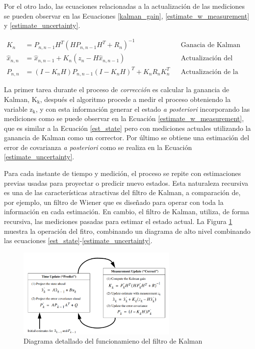 \documentclass[10pt,a4paper]{article}
\begin{document}
\noindent Por el otro lado, las ecuaciones relacionadas a la actualizaci\'on de 
las mediciones se pueden observar en las Ecuaciones \ref{kalman_gain},
\ref{estimate_w_measurement} y \ref{estimate_uncertainty}.

\begin{align}
    K_n &= P_{n, n-1}H^T(HP_{n,n-1}H^T + R_n)^{-1} & & \textrm{Ganacia de Kalman}
    \label{kalman_gain}\\
    \hat{x}_{n, n} &= \hat{x}_{n,n-1} + K_n \left(z_n - H\hat{x}_{n, n-1}\right)
    & & \textrm{Actualizaci\'on del estado}\label{estimate_w_measurement}\\
    P_{n, n} &= \left(I - K_nH\right)P_{n,n-1}\left(I - K_nH\right)^T + K_n R_n
    K_n^T & & \textrm{Actualizaci\'on de la covarianza}
    \label{estimate_uncertainty}
\end{align}

\noindent La primer tarea durante el proceso de \emph{correcci\'on} es calcular 
la ganancia de Kalman, $\mathrm{K_k}$, despu\'es el algoritmo procede a medir el
proceso obteniendo la variable $\mathrm{z_k}$, y con esta informaci\'on generar
el estado \emph{a posteriori} incorporando las mediciones como se puede observar
en la Ecuaci\'on \ref{estimate_w_measurement}, que es similar a la Ecuaci\'on
\ref{est_state} pero con mediciones actuales utilizando la ganancia de Kalman
como un corrector. Por \'ultimo se obtiene una estimaci\'on del error de
covarianza \emph{a posteriori} como se realiza en la Ecuaci\'on
\ref{estimate_uncertainty}. 

\noindent Para cada instante de tiempo y medici\'on, el proceso se repite con 
estimaciones previas usadas para proyectar o predicir nuevo estados. Esta 
naturaleza recursiva es una de las caracter\'isticas atractivas del filtro de 
Kalman, a comparaci\'on de, por ejemplo, un filtro de Wiener \cite{brown_hwang} 
que es diseñado para operar con toda la informaci\'on en cada estimaci\'on. 
En cambio, el filtro de Kalman, utiliza, de forma recursiva, las mediciones 
pasadas para estimar el estado actual. La Figura \ref{complete_kf} muestra la 
operaci\'on del fitro, combinando un diagrama de alto nivel combinando las 
ecuaciones \ref{est_state}-\ref{estimate_uncertainty}.

\begin{figure}[h!]
    \begin{center}
        \includegraphics[width=0.7\textwidth]{kf_complete.png}
        \caption{Diagrama detallado del funcionamieno del filtro de Kalman}
        \label{complete_kf}
    \end{center}
\end{figure}
\end{document}
